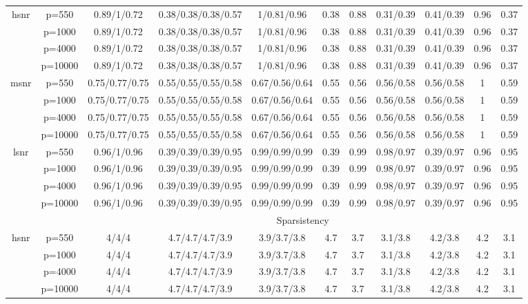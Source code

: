 \begin{table}[ht]
{\begin{tabular}{|c|c|ccccccccc|}
\midrule\multirow{4}[2]{*}{hsnr} & p=550 & 0.89/1/0.72 & 0.38/0.38/0.38/0.57 & 1/0.81/0.96 & 0.38 & 0.88 & 0.31/0.39 & 0.41/0.39 & 0.96 & 0.37 \\ 
   & p=1000 & 0.89/1/0.72 & 0.38/0.38/0.38/0.57 & 1/0.81/0.96 & 0.38 & 0.88 & 0.31/0.39 & 0.41/0.39 & 0.96 & 0.37 \\ 
   & p=4000 & 0.89/1/0.72 & 0.38/0.38/0.38/0.57 & 1/0.81/0.96 & 0.38 & 0.88 & 0.31/0.39 & 0.41/0.39 & 0.96 & 0.37 \\ 
   & p=10000 & 0.89/1/0.72 & 0.38/0.38/0.38/0.57 & 1/0.81/0.96 & 0.38 & 0.88 & 0.31/0.39 & 0.41/0.39 & 0.96 & 0.37 \\ 
  \midrule\multirow{4}[2]{*}{msnr} & p=550 & 0.75/0.77/0.75 & 0.55/0.55/0.55/0.58 & 0.67/0.56/0.64 & 0.55 & 0.56 & 0.56/0.58 & 0.56/0.58 & 1 & 0.59 \\ 
   & p=1000 & 0.75/0.77/0.75 & 0.55/0.55/0.55/0.58 & 0.67/0.56/0.64 & 0.55 & 0.56 & 0.56/0.58 & 0.56/0.58 & 1 & 0.59 \\ 
   & p=4000 & 0.75/0.77/0.75 & 0.55/0.55/0.55/0.58 & 0.67/0.56/0.64 & 0.55 & 0.56 & 0.56/0.58 & 0.56/0.58 & 1 & 0.59 \\ 
   & p=10000 & 0.75/0.77/0.75 & 0.55/0.55/0.55/0.58 & 0.67/0.56/0.64 & 0.55 & 0.56 & 0.56/0.58 & 0.56/0.58 & 1 & 0.59 \\ 
  \midrule\multirow{4}[2]{*}{lsnr} & p=550 & 0.96/1/0.96 & 0.39/0.39/0.39/0.95 & 0.99/0.99/0.99 & 0.39 & 0.99 & 0.98/0.97 & 0.39/0.97 & 0.96 & 0.95 \\ 
   & p=1000 & 0.96/1/0.96 & 0.39/0.39/0.39/0.95 & 0.99/0.99/0.99 & 0.39 & 0.99 & 0.98/0.97 & 0.39/0.97 & 0.96 & 0.95 \\ 
   & p=4000 & 0.96/1/0.96 & 0.39/0.39/0.39/0.95 & 0.99/0.99/0.99 & 0.39 & 0.99 & 0.98/0.97 & 0.39/0.97 & 0.96 & 0.95 \\ 
   & p=10000 & 0.96/1/0.96 & 0.39/0.39/0.39/0.95 & 0.99/0.99/0.99 & 0.39 & 0.99 & 0.98/0.97 & 0.39/0.97 & 0.96 & 0.95 \\ 
   \midrule 
 \multicolumn{1}{|c}{} &       & \multicolumn{9}{c|}{Sparsistency} \\
\midrule\multirow{4}[2]{*}{hsnr} & p=550 & 4/4/4 & 4.7/4.7/4.7/3.9 & 3.9/3.7/3.8 & 4.7 & 3.7 & 3.1/3.8 & 4.2/3.8 & 4.2 & 3.1 \\ 
   & p=1000 & 4/4/4 & 4.7/4.7/4.7/3.9 & 3.9/3.7/3.8 & 4.7 & 3.7 & 3.1/3.8 & 4.2/3.8 & 4.2 & 3.1 \\ 
   & p=4000 & 4/4/4 & 4.7/4.7/4.7/3.9 & 3.9/3.7/3.8 & 4.7 & 3.7 & 3.1/3.8 & 4.2/3.8 & 4.2 & 3.1 \\ 
   & p=10000 & 4/4/4 & 4.7/4.7/4.7/3.9 & 3.9/3.7/3.8 & 4.7 & 3.7 & 3.1/3.8 & 4.2/3.8 & 4.2 & 3.1 \\ 

\end{tabular}}
\end{table}
